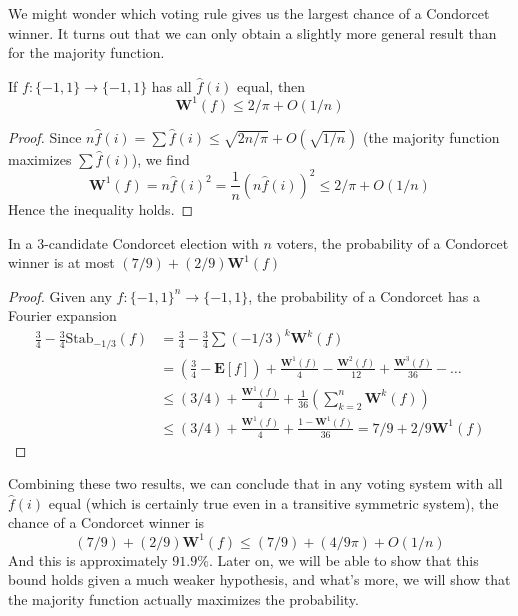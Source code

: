 We might wonder which voting rule gives us the largest chance of a Condorcet winner. It turns out that we can only obtain a slightly more general result than for the majority function.

\begin{lemma}
    If $f: \{ -1, 1 \} \to \{ -1, 1 \}$ has all $\widehat{f}(i)$ equal, then
    \[ \mathbf{W}^1(f) \leq 2/\pi + O(1/n) \]
\end{lemma}
\begin{proof}
    Since $n \widehat{f}(i) = \sum \widehat{f}(i) \leq \sqrt{2n/\pi} + O(\sqrt{1/n})$ (the majority function maximizes $\sum \widehat{f}(i)$), we find
    \[ \mathbf{W}^1(f) = n \widehat{f}(i)^2 = \frac{1}{n} (n \widehat{f}(i))^2 \leq 2/\pi + O(1/n) \]
    Hence the inequality holds.
\end{proof}

\begin{theorem}
    In a 3-candidate Condorcet election with $n$ voters, the probability of a Condorcet winner is at most $(7/9) + (2/9) \mathbf{W}^1(f)$
\end{theorem}
\begin{proof}
    Given any $f: \{ -1, 1 \}^n \to \{ -1, 1 \}$, the probability of a Condorcet has a Fourier expansion
    \begin{align*}
        \frac{3}{4} - \frac{3}{4} \text{Stab}_{-1/3}(f) &= \frac{3}{4} - \frac{3}{4} \sum (-1/3)^k \mathbf{W}^k(f)\\
        &= \left( \frac{3}{4} - \mathbf{E}[f] \right) + \frac{\mathbf{W}^1(f)}{4} - \frac{\mathbf{W}^2(f)}{12} + \frac{\mathbf{W}^3(f)}{36} - \dots\\
        &\leq (3/4) + \frac{\mathbf{W}^1(f)}{4} + \frac{1}{36} \left( \sum_{k = 2}^n \mathbf{W}^{k}(f) \right)\\
        &\leq (3/4) + \frac{\mathbf{W}^1(f)}{4} + \frac{1 - \mathbf{W}^1(f)}{36} = 7/9 + 2/9 \mathbf{W}^1(f)
    \end{align*}
\end{proof}

Combining these two results, we can conclude that in any voting system with all $\widehat{f}(i)$ equal (which is certainly true even in a transitive symmetric system), the chance of a Condorcet winner is
%
\[ (7/9) + (2/9) \mathbf{W}^1(f) \leq (7/9) + (4/9\pi) + O(1/n) \]
%
And this is approximately $91.9\%$. Later on, we will be able to show that this bound holds given a much weaker hypothesis, and what's more, we will show that the majority function actually maximizes the probability.

